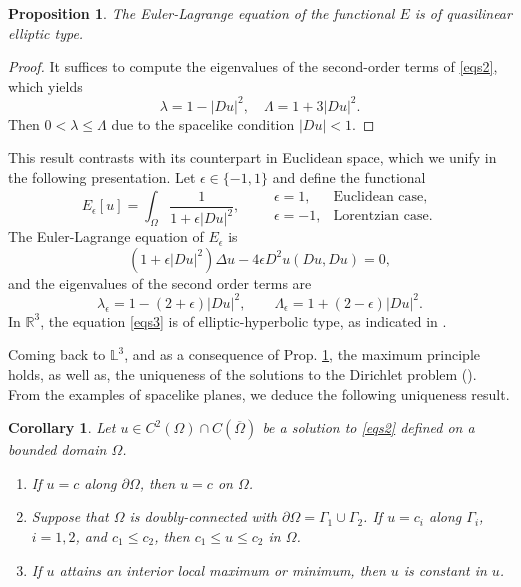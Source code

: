 \documentclass[a4paper,12pt]{amsart}
\newtheorem{corollary}[theorem]{Corollary}
\newtheorem{proposition}[theorem]{Proposition}
\theoremstyle{definition}
\def\r{\mathbb R}
\def\l{\mathbb L}
\begin{document}
\begin{proposition}\label{pr-31}
 The Euler-Lagrange equation of the functional $E$ is of quasilinear elliptic type.
\end{proposition}
\begin{proof} It suffices to compute the eigenvalues of the second-order terms of \eqref{eqs2}, which yields  
$$\lambda=1-|Du|^2,\quad \Lambda=1+3|Du|^2.$$
Then $0<\lambda\leq \Lambda$ due to the spacelike condition $|Du|<1$. 
\end{proof}
This result contrasts with  its counterpart in Euclidean space, which we unify in the following presentation. Let $\epsilon\in\{-1,1\}$ and define the functional 
\begin{equation}\label{e1}
E_\epsilon[u]=\int_\Omega\frac{1}{1+\epsilon|Du|^2},\qquad \begin{array}{ll}
\epsilon=1,& \mbox{Euclidean case},\\
\epsilon=-1,& \mbox{Lorentzian case}.
\end{array}\end{equation}
The Euler-Lagrange equation of $E_\epsilon$ is 
\begin{equation}\label{eqs3}
(1+\epsilon|Du|^2)\Delta u-4\epsilon D^2u(Du,Du)=0,
\end{equation}
and the eigenvalues of the second order terms are 
\begin{equation*}
\lambda_\epsilon=1-(2+\epsilon)|Du|^2,\qquad 
\Lambda_\epsilon=1+(2-\epsilon)|Du|^2.
\end{equation*}
In $\r^3$, the equation \eqref{eqs3} is of  elliptic-hyperbolic  type, as indicated in \cite{bfk}.  

Coming back to $\l^3$, and as a consequence of Prop. \ref{pr-31}, the maximum principle holds, as well as, the uniqueness of the solutions to the Dirichlet problem (\cite[Sect. 10]{gt}). From the examples of spacelike planes, we deduce the following  uniqueness result.

\begin{corollary} \label{c-32}
Let $u\in C^2(\Omega)\cap C(\overline{\Omega})$ be a solution to \eqref{eqs2} defined on a bounded domain $\Omega$.
\begin{enumerate}
\item If $u=c$ along $\partial\Omega$,  then $u=c$ on $\Omega$.
\item Suppose that $\Omega$ is doubly-connected with $\partial\Omega=\Gamma_1\cup\Gamma_2$. If $u=c_i$ along $\Gamma_i$, $i=1,2$,  and $c_1\leq c_2$, then $c_1\leq u\leq c_2$ in $\Omega$.
\item If $u$ attains an interior local maximum or minimum, then $u$ is constant in $u$.
\end{enumerate}  
\end{corollary}
\end{document}
